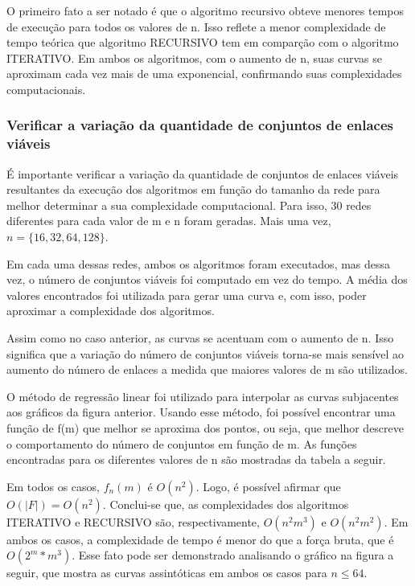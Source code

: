 O primeiro fato a ser notado é que o algoritmo recursivo obteve menores tempos de execução para todos os valores de n. Isso reflete a menor complexidade de tempo teórica que algoritmo RECURSIVO tem em comparção com o algoritmo ITERATIVO. Em ambos os algoritmos, com o aumento de n, suas curvas se aproximam cada vez mais de uma exponencial, confirmando suas complexidades computacionais.

\subsubsection{Verificar a variação da quantidade de conjuntos de enlaces viáveis}

É importante verificar a variação da quantidade de conjuntos de enlaces viáveis resultantes da execução dos algoritmos em função do tamanho da rede para melhor determinar a sua complexidade computacional. Para isso, 30 redes diferentes para cada valor de m e n foram geradas. Mais uma vez, $n=\{16,32,64,128\}$. 

Em cada uma dessas redes, ambos os algoritmos foram executados, mas dessa vez, o número de conjuntos viáveis foi computado em vez do tempo. A média dos valores encontrados foi utilizada para gerar uma curva e, com isso, poder aproximar a complexidade dos algoritmos.


Assim como no caso anterior, as curvas se acentuam com o aumento de n. Isso significa que a variação do número de conjuntos viáveis torna-se mais sensível ao aumento do número de enlaces a medida que maiores valores de m são utilizados. 

O método de regressão linear foi utilizado para interpolar as curvas subjacentes aos gráficos da figura anterior. Usando esse método, foi possível encontrar uma função de f(m) que melhor se aproxima dos pontos, ou seja, que melhor descreve o comportamento do número de conjuntos em função de m. As funções encontradas para os diferentes valores de n são mostradas da tabela a seguir.


Em todos os casos, $f_n(m)$ é $O(n^2)$. Logo, é possível afirmar que $O(|F|)=O(n^2)$. Conclui-se que, as complexidades dos algoritmos ITERATIVO e RECURSIVO são, respectivamente, $O(n^2m^3)$ e $O(n^2m^2)$. Em ambos os casos, a complexidade de tempo é menor do que a força bruta, que é $O(2^m*m^3)$. Esse fato pode ser demonstrado analisando o gráfico na figura a seguir, que mostra as curvas assintóticas em ambos os casos para $n \leq 64$.

